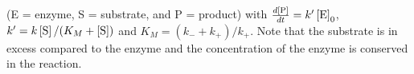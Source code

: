 \begin{enumerate}
\noindent
(E = enzyme, S = substrate, and P = product) with $\frac{d\left[\textnormal{P}\right]}{dt} = k'\left[\textnormal{E}\right]_0$, $k' = k\left[\textnormal{S}\right] / (K_M + \left[\textnormal{S}\right])$ and $K_M = (k_- + k_+) / k_+$. Note that the substrate is in excess compared to the enzyme and the concentration of the enzyme is conserved in the reaction.\\


\end{enumerate}

